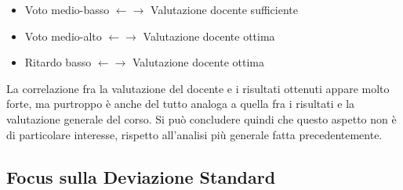             \begin{itemize}
                \item Voto medio-basso  $\leftarrow \rightarrow$ Valutazione docente sufficiente
                \item Voto medio-alto  $\leftarrow \rightarrow$ Valutazione docente ottima
                \item Ritardo basso  $\leftarrow \rightarrow$ Valutazione docente ottima
            \end{itemize}

            La correlazione fra la valutazione del docente e i risultati ottenuti appare molto forte, ma purtroppo è anche del tutto analoga a quella fra i risultati e la valutazione generale del corso. Si può concludere quindi che questo aspetto non è di particolare interesse, rispetto all'analisi più generale fatta precedentemente.

        \subsection{Focus sulla Deviazione Standard}

            
